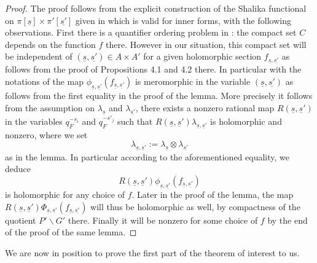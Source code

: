 \documentclass[11pt,letterpaper]{amsart}
\theoremstyle{plain}
\numberwithin{equation}{section}
\begin{document}
\begin{proof}
The proof follows from the explicit construction of the Shalika functional on $\pi[\underline{s}]\times \pi'[\underline{s'}]$ given in \cite{MatBLMS} which is valid for inner forms, with the following observations. First there is a quantifier ordering problem in \cite[Lemma 3.2]{MatBLMS}: the compact set $C$ depends on the function $f$ there. However in our situation, this compact set will be independent of $(\underline{s},\underline{s'})\in A\times A'$ for a given holomorphic section $f_{ \underline{s},\underline{s'} }$ as follows from the proof of Propositions 4.1 and 4.2 there. In particular with the notations of \cite[Lemma 3.2]{MatBLMS} the map $\phi_{\underline{s},\underline{s'} }(f_{ \underline{s},\underline{s'} })$ is meromorphic in the variable $(\underline{s},\underline{s'})$ as follows from the 
first equality in the proof of the lemma. More precisely it follows from the assumption on $\lambda_{\underline{s}}$ and $\lambda_{\underline{s'}}$, there exists a nonzero rational map $R(\underline{s},\underline{s}')$ in the variables $q_F^{-s_i}$ and $q_F^{-s'_j}$ such that $R(\underline{s},\underline{s}')\lambda_{\underline{s},\underline{s}'}$ is holomorphic and nonzero, where we set 
\[\lambda_{\underline{s},\underline{s}'}:=\lambda_{\underline{s}}\otimes \lambda_{\underline{s'}}\] as in the lemma. In particular according to the aforementioned equality, we deduce \[R(\underline{s},\underline{s}')\phi_{ \underline{s},\underline{s'} }(f_{ \underline{s},\underline{s'} })\] is holomorphic for any choice of $f$. Later in the proof of the lemma, the map $R(\underline{s},\underline{s}')\Phi_{ \underline{s},\underline{s'} }(f_{ \underline{s},\underline{s'} })$ will thus be holomorphic as well, by compactness of the quotient 
$P'\backslash G'$ there. Finally it will be nonzero for some choice of $f$ by the end of the proof of the same lemma.
\end{proof}

We are now in position to prove the first part of the theorem of interest to us.
\end{document}
